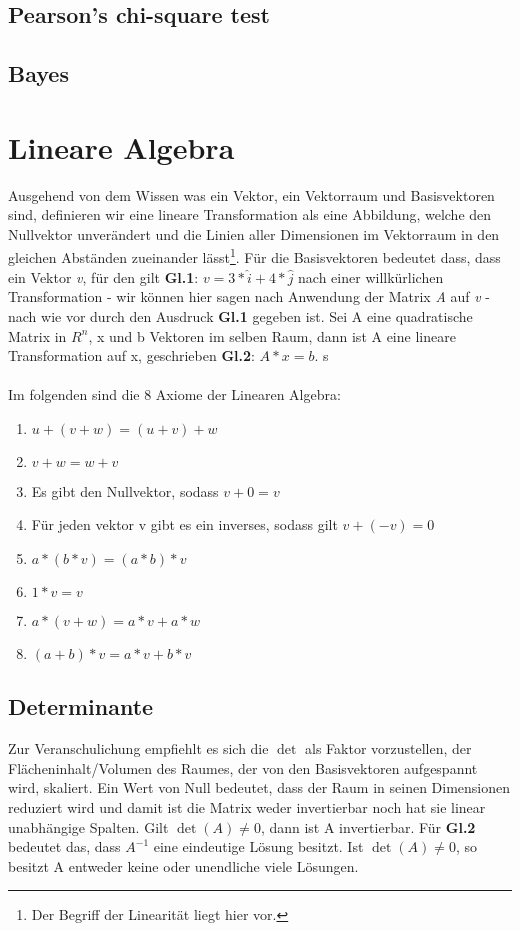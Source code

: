 \documentclass{scrreprt}
\begin{document}
\subsection{Pearson's chi-square test}\label{Pearson's chi-square test}
\subsection{Bayes}\label{Bayes}
%
\section{Lineare Algebra}\label{Lineare Algebra}
%
Ausgehend von dem Wissen was ein Vektor, ein Vektorraum und Basisvektoren sind, definieren wir eine lineare Transformation als eine Abbildung, welche den Nullvektor unverändert und die Linien aller Dimensionen im Vektorraum in den gleichen Abständen zueinander lässt\footnote[1]{Der Begriff der Linearität liegt hier vor.}.
Für die Basisvektoren bedeutet dass, dass ein Vektor \textit{v}, für den gilt \textbf{Gl.1}: $v=3*\hat{i}+4*\hat{j}$ nach einer willkürlichen Transformation - wir können hier sagen nach Anwendung der Matrix \textit{A} auf \textit{v} - nach wie vor durch den Ausdruck \textbf{Gl.1} gegeben ist. 
Sei A eine quadratische Matrix in $R^n$, x und b Vektoren im selben Raum, dann ist A eine lineare Transformation auf x, geschrieben \textbf{Gl.2}: $A*x=b$. s
\\
\vspace{0.1cm}
\\
Im folgenden sind die 8 Axiome der Linearen Algebra:
\begin{enumerate}
    \item $u+(v+w)=(u+v)+w$
    \item $v+w=w+v$
    \item Es gibt den Nullvektor, sodass $v+0=v$
    \item Für jeden vektor v gibt es ein inverses, sodass gilt $v+(-v)=0$
    \item $a*(b*v)=(a*b)*v$
    \item $1*v=v$
    \item $a*(v+w)=a*v+a*w$
    \item $(a+b)*v=a*v+b*v$
\end{enumerate}
\subsection{Determinante}\label{Determinante}
Zur Veranschulichung empfiehlt es sich die $\det$ als Faktor vorzustellen, der Flächeninhalt/Volumen des Raumes, der von den Basisvektoren aufgespannt wird, skaliert. Ein Wert von Null bedeutet, dass der Raum in seinen Dimensionen reduziert wird und damit ist die Matrix weder invertierbar noch hat sie linear unabhängige Spalten. Gilt $\det(A)\neq0$, dann ist A invertierbar.
Für \textbf{Gl.2} bedeutet das, dass $A^{-1}$ eine eindeutige Lösung besitzt. Ist $\det(A)\neq0$, so besitzt A entweder keine oder unendliche viele Lösungen.
%
\end{document}
